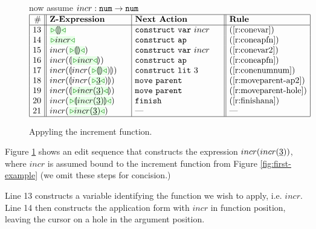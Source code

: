 \begin{figure}[t!]
\begin{center}
\colorbox{light-gray}{\hspace{53px} now assume $incr : \texttt{num} \rightarrow \texttt{num}$ \hspace{53px}}
$\arraycolsep=4px
\begin{array}{|r||l|l||l|l|}
\hline
\# & \textbf{Z-Expression} & 
\textbf{Next Action} & \textbf{Rule}
\\
\hline
13 &
\zwsel{\hhole{}} & 
\aConstruct{\fvar{incr}} \hphantom{~\,\,~~}& 
\text{(\ref{r:conevar})}
\\ 14 & 
\zwsel{incr} & 
\aConstruct{\fap} & 
\text{(\ref{r:coneapfn})}
\\ 15 & 
incr(\zwsel{\hhole{}}) & 
\aConstruct{\fvar{incr}} & 
\text{(\ref{r:conevar2})}
\\ 16 & 
incr(\hhole{\zwsel{incr}}) & 
\aConstruct{\fap} & 
\text{(\ref{r:coneapfn})}
\\ 17 & 
incr(\hhole{incr(\zwsel{\hhole{}})}) \hphantom{~~~~} & 
\aConstruct{\fnumlit{3}} & 
\text{(\ref{r:conenumnum})}
\\ 18 & 
incr(\hhole{incr(\zwsel{\hnum{3}})}) & 
\aMove{\dParent}& 
\text{(\ref{r:moveparent-ap2})}
\\ 19 & 
incr(\hhole{\zwsel{incr(\hnum{3})}}) & 
\aMove{\dParent} & 
\text{(\ref{r:moveparent-hole})}
\\ 20 &
incr(\zwsel{\hhole{incr(\hnum{3})}})& 
\aFinish & 
\text{(\ref{r:finishana})}
\\ 21 & 
incr(\zwsel{incr(\hnum{3})}) & 
\textrm{---} & 
{\textrm{---}}
\\ \hline
\end{array}
$\end{center}\vspace{-6px}
\caption{Appyling the increment function.}
\label{fig:second-example}
\end{figure}

Figure \ref{fig:second-example} shows an edit sequence that constructs the expression $incr(incr(\underline{3}))$, where $incr$ is assumed bound to the increment function from Figure \ref{fig:first-example} (we omit these steps for concision.)

Line 13 constructs a variable identifying the function we wish to apply, i.e. $incr$. Line 14 then constructs the application form with $incr$ in function position, leaving the cursor on a hole in the argument position.

